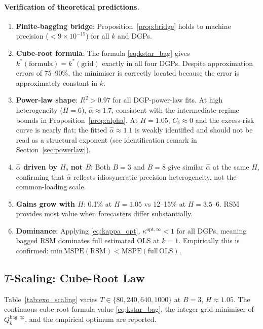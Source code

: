 \documentclass[12pt,a4paper]{article}
\theoremstyle{definition}
\begin{document}
\paragraph{Verification of theoretical predictions.}
\begin{enumerate}
\item \textbf{Finite-bagging bridge}: Proposition~\ref{prop:bridge} holds
  to machine precision ($<9\times10^{-15}$) for all $k$ and DGPs.
\item \textbf{Cube-root formula}: The formula \eqref{eq:kstar_bag} gives
  $k^*(\mathrm{formula})=k^*(\mathrm{grid})$ exactly in all four DGPs.
  Despite approximation errors of 75--90\%, the minimiser is correctly
  located because the error is approximately constant in $k$.
\item \textbf{Power-law shape}: $R^2>0.97$ for all DGP-power-law fits.
  At high heterogeneity ($H=6$), $\hat\alpha\approx1.7$, consistent with
  the intermediate-regime bounds in Proposition~\ref{prop:alpha}. At
  $H=1.05$, $C_\delta\approx0$ and the excess-risk curve is nearly flat;
  the fitted $\hat\alpha\approx1.1$ is weakly identified and should not be
  read as a structural exponent (see identification remark in
  Section~\ref{sec:powerlaw}).
\item \textbf{$\hat\alpha$ driven by $H$, not $B$}: Both $B=3$ and $B=8$
  give similar $\hat\alpha$ at the same $H$, confirming that
  $\hat\alpha$ reflects idiosyncratic precision heterogeneity, not
  the common-loading scale.
\item \textbf{Gains grow with $H$}: 0.1\% at $H=1.05$ vs 12--15\% at
  $H=3.5$--6. RSM provides most value when forecasters differ substantially.
\item \textbf{Dominance}: Applying \eqref{eq:kappa_opt}, $\kappa^{\mathrm{opt},\infty}<1$
  for all DGPs, meaning bagged RSM dominates full estimated OLS at $k=1$.
  Empirically this is confirmed: $\mathrm{min\,MSPE}(\mathrm{RSM})<\mathrm{MSPE}(\mathrm{full\,OLS})$.
\end{enumerate}

\subsection{$T$-Scaling: Cube-Root Law}

Table~\ref{tab:exo_scaling} varies $T\in\{80,240,640,1000\}$ at $B=3$,
$H\approx1.05$. The continuous cube-root formula value \eqref{eq:kstar_bag},
the integer grid minimiser of $Q_k^{\mathrm{bag},\infty}$, and the empirical
optimum are reported.
\end{document}
